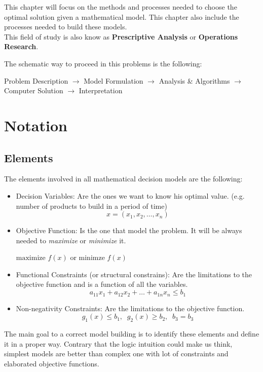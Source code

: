 This chapter will focus on the methods and processes needed to choose the optimal 
solution given a mathematical model. This chapter also include the processes needed to build these models.\\

This field of study is also know as \textbf{Prescriptive Analysis} or \textbf{Operations Research}.

The schematic way to proceed in this problems is the following:
\begin{center}
    Problem Description $\rightarrow$ Model Formulation $\rightarrow$ Analysis \& Algorithms $\rightarrow$
    Computer Solution $\rightarrow$ Interpretation
\end{center}

\section{Notation}
\subsection{Elements}
The elements involved in all mathematical decision models are the following:
\begin{itemize}
    \item Decision Variables: Are the ones we want to know his optimal value. (e.g. number of products to 
    build in a period of time)
        \[ x = (x_1, x_2, \dots , x_n) \]
    \item Objective Function: Is the one that model the problem. It will be always needed to \textit{maximize} or \textit{minimize} it.
    \begin{center}
        $\text{maximize } f(x)$ or $\text{minimze } f(x)$
    \end{center}
    \item Functional Constraints (or structural constrains): Are the limitations to the objective function and is a function of all the variables.
        \[ a_{11}x_1 + a_{12}x_2 + \dots + a_{1n}x_n \leq b_1 \]
    \item Non-negativity Constraints: Are the limitations to the objective function.
        \[ g_1(x)\leq b_1,\;\; g_2(x)\geq b_2, \;\; b_3=b_3 \]
\end{itemize}

The main goal to a correct model building is to identify these elements and define it in a proper way. Contrary that the logic 
intuition could make us think, simplest models are better than complex one with lot of constraints and elaborated objective functions. \\

